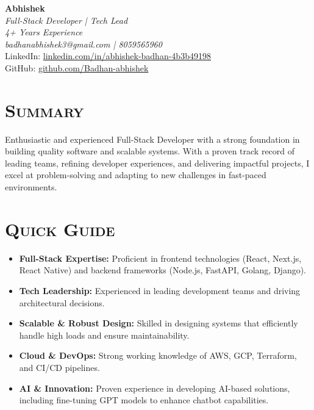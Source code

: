 \documentclass[a4paper,10pt]{article}
\newcommand{\resumesection}[1]{\section*{\scshape{#1}}}
\begin{document}
\begin{center}
    \textbf{\Huge Abhishek} \\
    \vspace{0.1cm}
    \textit{Full-Stack Developer | Tech Lead} \\
    \vspace{0.1cm}
    \textit{4+ Years Experience} \\
    \vspace{0.1cm}
    \textit{badhanabhishek3@gmail.com | 8059565960} \\
    LinkedIn: \href{https://www.linkedin.com/in/abhishek-badhan-4b3b49198/}{linkedin.com/in/abhishek-badhan-4b3b49198} \\
    GitHub: \href{https://github.com/Badhan-abhishek}{github.com/Badhan-abhishek} \\
\end{center}

\resumesection{Summary}
Enthusiastic and experienced Full-Stack Developer with a strong foundation in building quality software and scalable systems. With a proven track record of leading teams, refining developer experiences, and delivering impactful projects, I excel at problem-solving and adapting to new challenges in fast-paced environments.

\resumesection{Quick Guide}
\begin{itemize}[leftmargin=0.5cm]
    \item \textbf{Full-Stack Expertise:} Proficient in frontend technologies (React, Next.js, React Native) and backend frameworks (Node.js, FastAPI, Golang, Django).
    \item \textbf{Tech Leadership:} Experienced in leading development teams and driving architectural decisions.
    \item \textbf{Scalable \& Robust Design:} Skilled in designing systems that efficiently handle high loads and ensure maintainability.
    \item \textbf{Cloud \& DevOps:} Strong working knowledge of AWS, GCP, Terraform, and CI/CD pipelines.
    \item \textbf{AI \& Innovation:} Proven experience in developing AI-based solutions, including fine-tuning GPT models to enhance chatbot capabilities.
\end{itemize}
\end{document}
